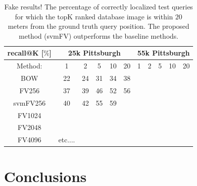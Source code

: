 \documentclass[table]{article} %
\begin{document}
\begin{table}
\begin{centering}
	\begin{tabularx}{0.6\linewidth}{c|c c c c c|c c c c c}
		\hline 
		\rowcolor{maroon!50}
		recall@K [$\%$] & \multicolumn{5}{c|}{25k Pittsburgh} & \multicolumn{5}{c|}{55k Pittsburgh} \\
		\hline 
		\hline 
		\rowcolor{maroon!50}
		Method: & 1 & 2 & 5 & 10 & 20 & 1 & 2 & 5 & 10 & 20\\
		\hline
		\rowcolor{maroon!10}
		BOW & 22 & 24 & 31 & 34 & 38 &  &  &  &  & \\
		\rowcolor{maroon!10}
		FV256 & 37 & 39 & 46 & 52 & 56 &  &  &  &  & \\
		\rowcolor{maroon!10}
		svmFV256 & 40  & 42 & 55 & 59 &  &  &  &  &  & \\
		\rowcolor{maroon!10}
		FV1024 &  &  &  &  &  &  &  &  &  &  	\\
		\rowcolor{maroon!10}
		FV2048 &  &  &  &  &  &  &  &  &  & \\
		\rowcolor{maroon!10}
		FV4096 & etc....  &  &  &  &  &  &  &  &  &  \\
		\hline
	\end{tabularx}
	\caption{ \textcolor{myRed}{Fake results!}
		The percentage of correctly localized test queries for which the topK ranked database image is within $20$ meters from the ground truth query position. The proposed method (svmFV) outperforms the baseline methods.
		}
	\label{tab:recall}
\end{centering}
\end{table}


\section{Conclusions}





\small{
	
	
	}
\end{document}
